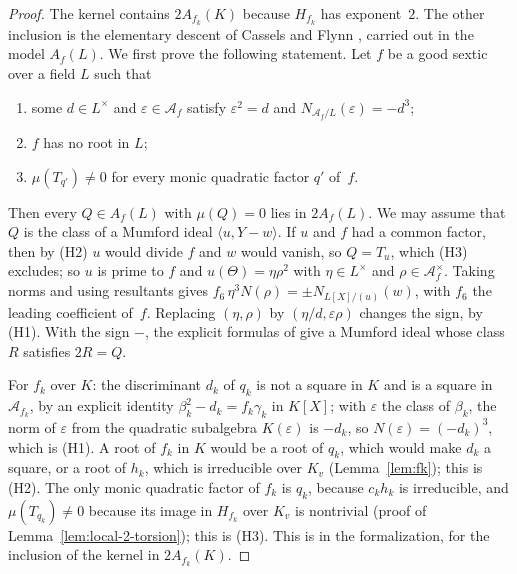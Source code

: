\documentclass[11pt]{amsart}
\theoremstyle{definition}
\numberwithin{equation}{section}
\newcommand{\kv}{K_v}
\begin{document}
\begin{proof}
The kernel contains $2A_{f_k}(K)$ because $H_{f_k}$ has exponent~$2$. The other inclusion is the elementary descent of Cassels and Flynn \cite[Chapter~6]{CF96}, carried out in the model $A_f(L)$. We first prove the following statement. Let $f$ be a good sextic over a field $L$ such that
\begin{enumerate}
\item[(H1)] some $d\in L^\times$ and $\varepsilon\in\mathcal A_f$ satisfy $\varepsilon^2=d$ and $N_{\mathcal A_f/L}(\varepsilon)=-d^3$;
\item[(H2)] $f$ has no root in $L$;
\item[(H3)] $\mu(T_{q'})\neq0$ for every monic quadratic factor $q'$ of~$f$.
\end{enumerate}
Then every $Q\in A_f(L)$ with $\mu(Q)=0$ lies in $2A_f(L)$. We may assume that $Q$ is the class of a Mumford ideal $\langle u,Y-w\rangle$. If $u$ and $f$ had a common factor, then by (H2) $u$ would divide $f$ and $w$ would vanish, so $Q=T_u$, which (H3) excludes; so $u$ is prime to $f$ and $u(\Theta)=\eta\rho^2$ with $\eta\in L^\times$ and $\rho\in\mathcal A_f^\times$. Taking norms and using resultants gives $f_6\,\eta^3N(\rho)=\pm N_{L[X]/(u)}(w)$, with $f_6$ the leading coefficient of~$f$. Replacing $(\eta,\rho)$ by $(\eta/d,\varepsilon\rho)$ changes the sign, by (H1). With the sign $-$, the explicit formulas of \cite[Chapter~6, Sections~1, 2, 5 and~8]{CF96} give a Mumford ideal whose class $R$ satisfies $2R=Q$.

For $f_k$ over $K$: the discriminant $d_k$ of $q_k$ is not a square in $K$ and is a square in $\mathcal A_{f_k}$, by an explicit identity $\beta_k^2-d_k=f_k\gamma_k$ in $K[X]$; with $\varepsilon$ the class of $\beta_k$, the norm of $\varepsilon$ from the quadratic subalgebra $K(\varepsilon)$ is $-d_k$, so $N(\varepsilon)=(-d_k)^3$, which is (H1). A root of $f_k$ in $K$ would be a root of $q_k$, which would make $d_k$ a square, or a root of $h_k$, which is irreducible over $\kv$ (Lemma~\ref{lem:fk}); this is (H2). The only monic quadratic factor of $f_k$ is $q_k$, because $c_kh_k$ is irreducible, and $\mu(T_{q_k})\neq0$ because its image in $H_{f_k}$ over $\kv$ is nontrivial (proof of Lemma~\ref{lem:local-2-torsion}); this is (H3). This is  in the formalization, for the inclusion of the kernel in $2A_{f_k}(K)$.
\end{proof}
\end{document}
